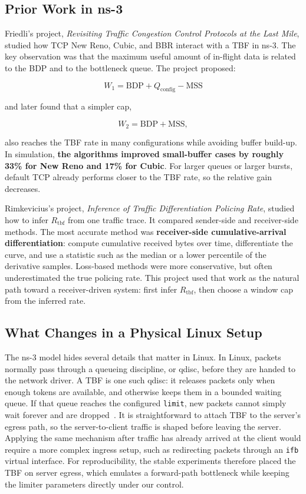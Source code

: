 \documentclass{article}
\newcommand{\code}[1]{\texttt{#1}}
\newcommand{\mss}{\mathrm{MSS}}
\newcommand{\bdp}{\mathrm{BDP}}
\begin{document}
\subsection{Prior Work in ns-3}

Friedli's project, \emph{Revisiting Traffic Congestion Control Protocols at the Last Mile}, studied how TCP New Reno, Cubic, 
and BBR interact with a TBF in ns-3. The key observation was that the maximum useful amount of in-flight data is related 
to the BDP and to the bottleneck queue. The project proposed:

\[
W_1 = \bdp + Q_{\mathrm{config}} - \mss
\]

and later found that a simpler cap,

\[
W_2 = \bdp + \mss,
\]

also reaches the TBF rate in many configurations while avoiding buffer build-up. In simulation, \textbf{the algorithms improved 
small-buffer cases by roughly 33\% for New Reno and 17\% for Cubic}. For larger queues or larger bursts, default TCP already 
performs closer to the TBF rate, so the relative gain decreases.

Rimkevicius's project, \emph{Inference of Traffic Differentiation Policing Rate}, studied how to infer \(R_{\mathrm{tbf}}\) 
from one traffic trace. It compared sender-side and receiver-side methods. The most accurate method was \textbf{receiver-side 
cumulative-arrival differentiation}: compute cumulative received bytes over time, differentiate the curve, and use a 
statistic such as the median or a lower percentile of the derivative samples. Loss-based methods were more 
conservative, but often underestimated the true policing rate. This project used that work as the natural 
path toward a receiver-driven system: first infer \(R_{\mathrm{tbf}}\), then choose a window cap from the inferred rate.

\subsection{What Changes in a Physical Linux Setup}

The ns-3 model hides several details that matter in Linux. In Linux, packets normally pass through a queueing discipline, 
or qdisc, before they are handed to the network driver. A TBF is one such qdisc: it releases packets only when enough 
tokens are available, and otherwise keeps them in a bounded waiting queue. If that queue reaches the configured 
\code{limit}, new packets cannot simply wait forever and are dropped~\cite{tc,tctbf}. It is straightforward to attach TBF to the server's 
egress path, so the server-to-client traffic is shaped before leaving the server. Applying the same mechanism after 
traffic has already arrived at the client would require a more complex ingress setup, such as redirecting packets through 
an \code{ifb} virtual interface. For reproducibility, the stable experiments therefore placed the TBF on server egress, 
which emulates a forward-path bottleneck while keeping the limiter parameters directly under our control.
\end{document}
